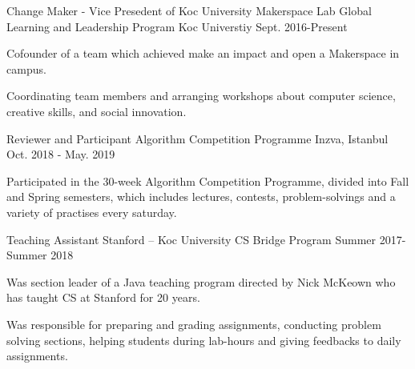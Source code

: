 

\begin{cventries}
  \cventry
    {Change Maker - Vice Presedent of Koc University Makerspace Lab} %
    {Global Learning and Leadership Program} %
    {Koc Universtiy} %
    {Sept. 2016-Present} %
    {
      \begin{cvitems} %
        \item {Cofounder of a team which achieved make an impact and open a Makerspace in campus.}
        \item {Coordinating team members and arranging workshops about computer science, creative skills, and social innovation. }
      \end{cvitems}
    }
  \cventry
    {Reviewer and Participant} %
    {Algorithm Competition Programme} %
    {Inzva, Istanbul} %
    {Oct. 2018 - May. 2019} %
    {
      \begin{cvitems} %
        \item {Participated in the 30-week Algorithm Competition Programme, divided into Fall and Spring semesters, which includes lectures, contests, problem-solvings and a variety of practises every saturday.}
      \end{cvitems}
    }


  \cventry
    {Teaching Assistant } %
    {Stanford – Koc University CS Bridge Program} %
    {} %
    {Summer 2017-Summer 2018} %
    {
      \begin{cvitems} %
        \item {Was section leader of a Java teaching program directed by Nick McKeown who has taught CS at Stanford for 20 years.}
        \item {Was responsible for preparing and grading assignments, conducting problem solving sections, helping students during lab-hours and giving feedbacks to daily assignments.}
      \end{cvitems}
    }
    

\end{cventries}
